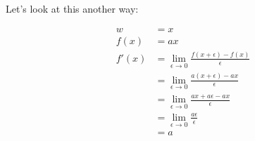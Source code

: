 \documentclass[12pt]{article}
\begin{document}
Let's look at this another way:

\[
\begin{aligned}
w &= x \\
f(x) &= ax \\[6pt]
f'(x) &= \lim_{\epsilon \to 0}
\frac{f(x+\epsilon)-f(x)}{\epsilon} \\[6pt]
&= \lim_{\epsilon \to 0}
\frac{a(x+\epsilon)-ax}{\epsilon} \\[6pt]
&= \lim_{\epsilon \to 0}
\frac{ax+a\epsilon-ax}{\epsilon} \\[6pt]
&= \lim_{\epsilon \to 0}
\frac{a\epsilon}{\epsilon} \\[6pt]
&= a
\end{aligned}
\]
\end{document}
